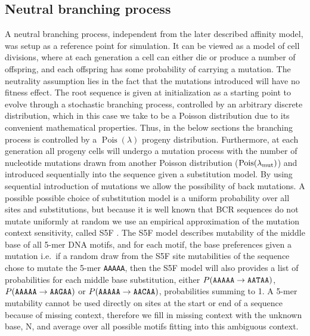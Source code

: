 \subsection{Neutral branching process}
A neutral branching process, independent from the later described affinity model, was setup as a reference point for simulation.
It can be viewed as a model of cell divisions, where at each generation a cell can either die or produce a number of offspring, and each offspring has some probability of carrying a mutation.
The neutrality assumption lies in the fact that the mutations introduced will have no fitness effect.
The root sequence is given at initialization as a starting point to evolve through a stochastic branching process, controlled by an arbitrary discrete distribution, which in this case we take to be a Poisson distribution due to its convenient mathematical properties.
Thus, in the below sections the branching process is controlled by a $\operatorname{Pois}(\lambda)$ progeny distribution.
Furthermore, at each generation all progeny cells will undergo a mutation process with the number of nucleotide mutations drawn from another Poisson distribution ($\operatorname{Pois}(\lambda_{\text{mut}})$) and introduced sequentially into the sequence given a substitution model.
By using sequential introduction of mutations we allow the possibility of back mutations.
A possible possible choice of substitution model is a uniform probability over all sites and substitutions, but because it is well known that BCR sequences do not mutate uniformly at random \cite{Yeap2015-nl} we use an empirical approximation of the mutation context sensitivity, called S5F \cite{cui2016model}.
The S5F model describes mutability of the middle base of all 5-mer DNA motifs, and for each motif, the base preferences given a mutation i.e.\ if a random draw from the S5F site mutabilities of the sequence chose to mutate the 5-mer \texttt{AAAAA}, then the S5F model will also provides a list of probabilities for each middle base substitution, either $P(\text{\texttt{AAAAA}} \rightarrow \text{\texttt{AATAA}})$, $P(\text{\texttt{AAAAA}} \rightarrow \text{\texttt{AAGAA}})$ or $P(\text{\texttt{AAAAA}} \rightarrow \text{\texttt{AACAA}})$, probabilities summing to 1.
A 5-mer mutability cannot be used directly on sites at the start or end of a sequence because of missing context, therefore we fill in missing context with the unknown base, N, and average over all possible motifs fitting into this ambiguous context.

